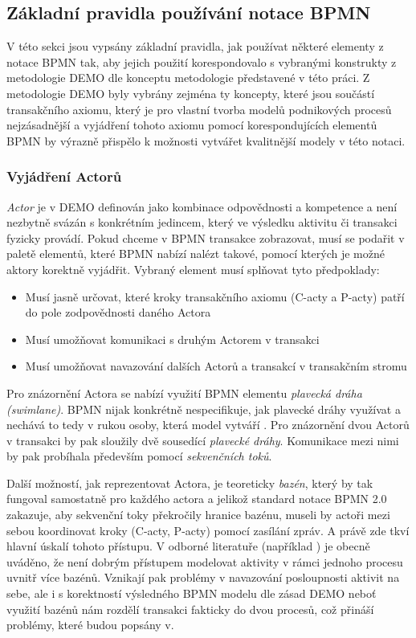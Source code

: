 \documentclass[]{article}
\begin{document}
\subsection{Základní pravidla používání notace BPMN}
V této sekci jsou vypsány základní pravidla, jak používat některé elementy z notace BPMN tak, aby jejich použití korespondovalo s vybranými konstrukty z metodologie DEMO dle konceptu metodologie představené v této práci. Z metodologie DEMO byly vybrány zejména ty koncepty, které jsou součástí transakčního axiomu, který je pro vlastní tvorba modelů podnikových procesů nejzásadnější a vyjádření tohoto axiomu pomocí korespondujících elementů BPMN by výrazně přispělo k možnosti vytvářet kvalitnější modely v této notaci.
\subsubsection{Vyjádření Actorů}
\textit{Actor} je v DEMO definován jako kombinace odpovědnosti a kompetence a není nezbytně svázán s konkrétním jedincem, který ve výsledku aktivitu či transakci fyzicky provádí. Pokud chceme v BPMN transakce zobrazovat, musí se podařit v paletě elementů, které BPMN nabízí nalézt takové, pomocí kterých je možné aktory korektně vyjádřit. Vybraný element musí splňovat tyto předpoklady:

\begin{itemize}
\item Musí jasně určovat, které kroky transakčního axiomu (C-acty a P-acty) patří do pole zodpovědnosti daného Actora
\item Musí umožňovat komunikaci s druhým Actorem v transakci
\item Musí umožňovat navazování dalších Actorů a transakcí v transakčním stromu
\end{itemize}

Pro znázornění Actora se nabízí využití BPMN elementu \textit{plavecká dráha (swimlane)}. BPMN nijak konkrétně nespecifikuje, jak plavecké dráhy využívat a nechává to tedy v rukou osoby, která model vytváří \cite{Silver2011}. Pro znázornění dvou Actorů v transakci by pak sloužily dvě sousedící \textit{plavecké dráhy}. Komunikace mezi nimi by pak probíhala především pomocí \textit{sekvenčních toků}.

Další možností, jak reprezentovat Actora, je teoreticky \textit{bazén}, který by tak fungoval samostatně pro každého actora a jelikož standard notace BPMN 2.0 zakazuje, aby sekvenční toky překročily hranice bazénu, museli by actoři mezi sebou koordinovat kroky (C-acty, P-acty) pomocí zasílání zpráv. A právě zde tkví hlavní úskalí tohoto přístupu. V odborné literatuře (například \cite{Silver2011}) je obecně uváděno, že není dobrým přístupem modelovat aktivity v rámci jednoho procesu uvnitř více bazénů. Vznikají pak problémy v navazování posloupnosti aktivit na sebe, ale i s korektností výsledného BPMN modelu dle zásad DEMO neboť využití bazénů nám rozdělí transakci fakticky do dvou procesů, což přináší problémy, které budou popsány v. %
\end{document}
